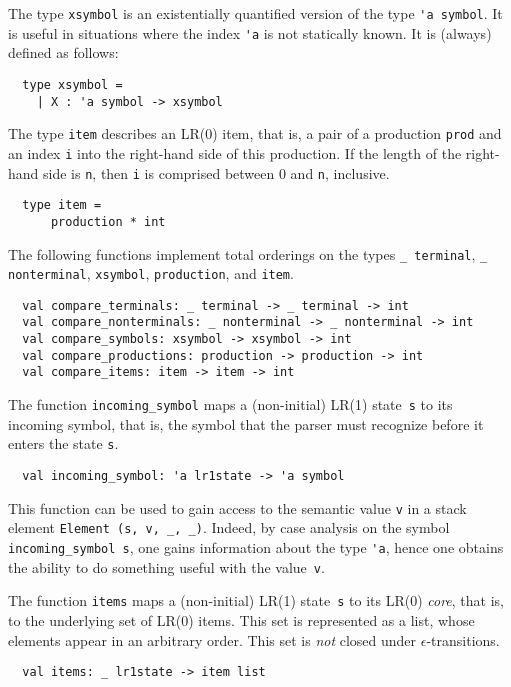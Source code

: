\documentclass[onecolumn,11pt,nocopyrightspace,preprint]{sigplanconf}
\begin{document}

The type \verb+xsymbol+ is an existentially quantified version of the
type \verb+'a symbol+. It is useful in situations where the index \verb+'a+ is
not statically known. It is (always) defined as follows:
%
\begin{verbatim}
  type xsymbol =
    | X : 'a symbol -> xsymbol
\end{verbatim}


The type \verb+item+ describes an LR(0) item, that is, a pair of a production
\verb+prod+ and an index \verb+i+ into the right-hand side of this production.
If the length of the right-hand side is \verb+n+, then \verb+i+ is
comprised between 0 and \verb+n+, inclusive.

\begin{verbatim}
  type item =
      production * int
\end{verbatim}


The following functions implement total orderings on the types
\verb+_ terminal+, \verb+_ nonterminal+, \verb+xsymbol+,
\verb+production+, and \verb+item+.

\begin{verbatim}
  val compare_terminals: _ terminal -> _ terminal -> int
  val compare_nonterminals: _ nonterminal -> _ nonterminal -> int
  val compare_symbols: xsymbol -> xsymbol -> int
  val compare_productions: production -> production -> int
  val compare_items: item -> item -> int
\end{verbatim}


The function \verb+incoming_symbol+ maps a (non-initial) LR(1)
state~\verb+s+ to its incoming symbol, that is, the symbol that the parser
must recognize before it enters the state \verb+s+.
%
\begin{verbatim}
  val incoming_symbol: 'a lr1state -> 'a symbol
\end{verbatim}
%
This function can be used to gain access to the semantic value \verb+v+
in a stack element \verb+Element (s, v, _, _)+. Indeed, by case analysis on the
symbol \verb+incoming_symbol s+, one gains information about the type \verb+'a+,
hence one obtains the ability to do something useful with the value~\verb+v+.


The function \verb+items+ maps a (non-initial) LR(1) state~\verb+s+ to its
LR(0) \emph{core}, that is, to the underlying set of LR(0) items. This set
is represented as a list, whose elements appear in an arbitrary order. This
set is \emph{not} closed under $\epsilon$-transitions.
%
\begin{verbatim}
  val items: _ lr1state -> item list
\end{verbatim}
\end{document}
